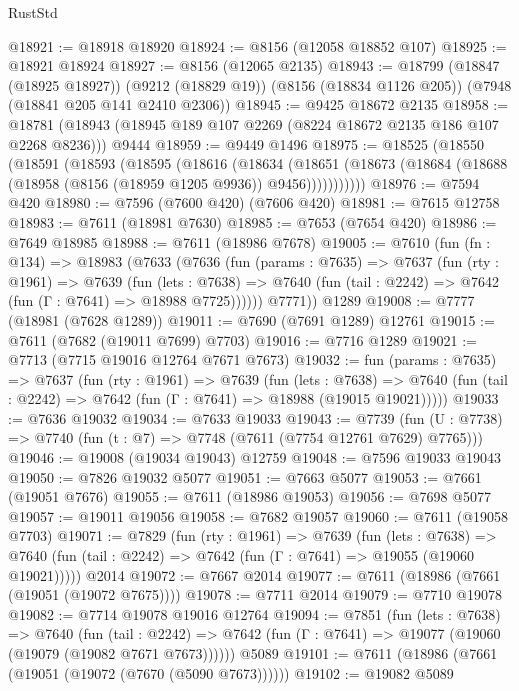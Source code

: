 \begin{lexlean}{RustStd}
\begin{coremodule}
{\begin{coremodule}
{{{{{{{{{{{{{{{{{{{{{{{{{{{{{{{{{{@18921 := @18918 @18920
@18924 := @8156 (@12058 @18852 @107)
@18925 := @18921 @18924
@18927 := @8156 (@12065 @2135)
@18943 := @18799
    (@18847 (@18925 @18927))
    (@9212 (@18829 @19))
    (@8156 (@18834 @1126 @205))
    (@7948 (@18841 @205 @141 @2410 @2306))
@18945 := @9425 @18672 @2135
@18958 := @18781 (@18943 (@18945 @189 @107 @2269 (@8224 @18672 @2135 @186 @107 @2268 @8236))) @9444
@18959 := @9449 @1496
@18975 := @18525
    (@18550
      (@18591
        (@18593
          (@18595
            (@18616
              (@18634
                (@18651
                  (@18673 (@18684 (@18688 (@18958 (@8156 (@18959 @1205 @9936)) @9456)))))))))))
@18976 := @7594 @420
@18980 := @7596 (@7600 @420) (@7606 @420)
@18981 := @7615 @12758
@18983 := @7611 (@18981 @7630)
@18985 := @7653 (@7654 @420)
@18986 := @7649 @18985
@18988 := @7611 (@18986 @7678)
@19005 := @7610
    (fun (fn : @134) =>
    @18983
      (@7633
        (@7636
          (fun (params : @7635) =>
          @7637
            (fun (rty : @1961) =>
            @7639
              (fun (lets : @7638) =>
              @7640 (fun (tail : @2242) => @7642 (fun (Γ : @7641) => @18988 @7725))))))
        @7771))
    @1289
@19008 := @7777 (@18981 (@7628 @1289))
@19011 := @7690 (@7691 @1289) @12761
@19015 := @7611 (@7682 (@19011 @7699) @7703)
@19016 := @7716 @1289
@19021 := @7713 (@7715 @19016 @12764 @7671 @7673)
@19032 := fun (params : @7635) =>
  @7637
    (fun (rty : @1961) =>
    @7639
      (fun (lets : @7638) =>
      @7640 (fun (tail : @2242) => @7642 (fun (Γ : @7641) => @18988 (@19015 @19021)))))
@19033 := @7636 @19032
@19034 := @7633 @19033
@19043 := @7739
    (fun (U : @7738) => @7740 (fun (t : @7) => @7748 (@7611 (@7754 @12761 @7629) @7765)))
@19046 := @19008 (@19034 @19043) @12759
@19048 := @7596 @19033 @19043
@19050 := @7826 @19032 @5077
@19051 := @7663 @5077
@19053 := @7661 (@19051 @7676)
@19055 := @7611 (@18986 @19053)
@19056 := @7698 @5077
@19057 := @19011 @19056
@19058 := @7682 @19057
@19060 := @7611 (@19058 @7703)
@19071 := @7829
    (fun (rty : @1961) =>
    @7639
      (fun (lets : @7638) =>
      @7640 (fun (tail : @2242) => @7642 (fun (Γ : @7641) => @19055 (@19060 @19021)))))
    @2014
@19072 := @7667 @2014
@19077 := @7611 (@18986 (@7661 (@19051 (@19072 @7675))))
@19078 := @7711 @2014
@19079 := @7710 @19078
@19082 := @7714 @19078 @19016 @12764
@19094 := @7851
    (fun (lets : @7638) =>
    @7640
      (fun (tail : @2242) =>
      @7642 (fun (Γ : @7641) => @19077 (@19060 (@19079 (@19082 @7671 @7673))))))
    @5089
@19101 := @7611 (@18986 (@7661 (@19051 (@19072 (@7670 (@5090 @7673))))))
@19102 := @19082 @5089
}}}}}}}}}}}}}}}}}}}}}}}}}}}}}}}}}}
\end{coremodule}}
\end{coremodule}
\end{lexlean}
